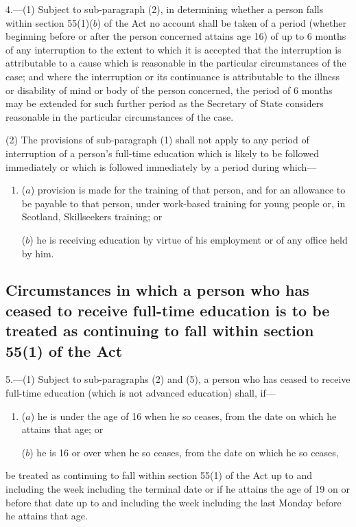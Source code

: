 \documentclass[a4paper,12pt]{article}
\begin{document}
4.—(1) Subject to sub-paragraph (2), in determining whether a person falls within section 55(1)($b$) of the Act no account shall be taken of a period (whether beginning before or after the person concerned attains age 16) of up to 6 months of any interruption to the extent to which it is accepted that the interruption is attributable to a cause which is reasonable in the particular circumstances of the case; and where the interruption or its continuance is attributable to the illness or disability of mind or body of the person concerned, the period of 6 months may be extended for such further period as 
the Secretary of State  %
considers reasonable in the particular circumstances of the case.

(2) The provisions of sub-paragraph (1) shall not apply to any period of interruption of a person’s full-time education which is likely to be followed immediately or which is followed immediately by a period during which—
\begin{enumerate}\item[]
($a$) provision is made for the training of that person, and for an allowance to be payable to that person, under 
work-based training for young people or, in Scotland, Skillseekers training;  %
or

($b$) he is receiving education by virtue of his employment or of any office held by him.
\end{enumerate}


\subsection*{Circumstances in which a person who has ceased to receive full-time education is to be treated as continuing to fall within section 55(1) of the Act}

5.—(1) Subject to sub-paragraphs (2) and (5), a person who has ceased to receive full-time education (which is not advanced education) shall, if—
\begin{enumerate}\item[]
($a$) he is under the age of 16 when he so ceases, from the date on which he attains that age; or

($b$) he is 16 or over when he so ceases, from the date on which he so ceases,
\end{enumerate}
be treated as continuing to fall within section 55(1) of the Act up to and including the week including the terminal date or if he attains the age of 19 on or before that date up to and including the week including the last Monday before he attains that age.
\end{document}
